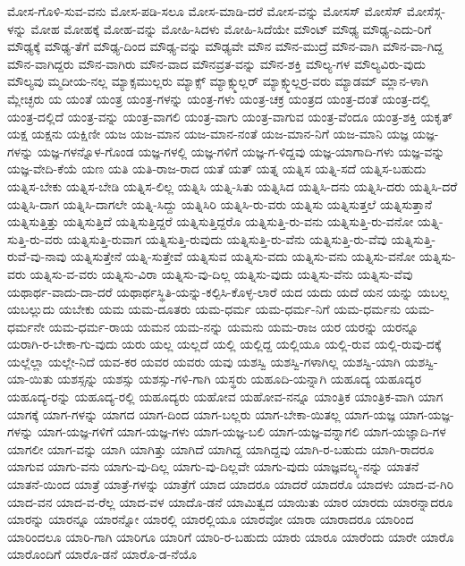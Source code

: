 {ಮೋಸ-ಗೊಳಿ-ಸುವ-ವನು
ಮೋಸ-ಪಡಿ-ಸಲೂ
ಮೋಸ-ಮಾಡಿ-ದರೆ
ಮೋಸ-ವನ್ನು
ಮೋಸಸ್
ಮೋಸೆಸ್
ಮೋಸೆಸ್ಗ-ಳನ್ನು
ಮೋಹ
ಮೋಹಕ್ಕೆ
ಮೋಹ-ವನ್ನು
ಮೋಹಿ-ಸಿದಳು
ಮೋಹಿ-ಸಿದೆಯೇ
ಮೌಂಟ್
ಮೌಢ್ಯ
ಮೌಢ್ಯ-ಎದು-ರಿಗೆ
ಮೌಢ್ಯಕ್ಕೆ
ಮೌಢ್ಯ-ತೆಗೆ
ಮೌಢ್ಯ-ದಿಂದ
ಮೌಢ್ಯ-ವನ್ನು
ಮೌಢ್ಯವೇ
ಮೌನ
ಮೌನ-ಮುದ್ರೆ
ಮೌನ-ವಾಗಿ
ಮೌನ-ವಾ-ಗಿದ್ದ
ಮೌನ-ವಾಗಿದ್ದರು
ಮೌನ-ವಾಗಿರು
ಮೌನ-ವಾದ
ಮೌನವ್ರತ-ವನ್ನು
ಮೌನ-ಶಕ್ತಿ
ಮೌಲ್ಯ-ಗಳ
ಮೌಲ್ಯವಿರು-ವುದು
ಮೌಲ್ಯವು
ಮ್ಮದೀಯ-ನಲ್ಲ
ಮ್ಯಾಕ್ಸಮುಲ್ಲರು
ಮ್ಯಾಕ್ಸ್
ಮ್ಯಾಕ್ಸ್ಮುಲ್ಲರ್
ಮ್ಯಾಕ್ಸ್ಮುಲ್ಲರ್ರ-ವರು
ಮ್ಯಾಡಮ್
ಮ್ಲಾನ-ಳಾಗಿ
ಮ್ಲೇಚ್ಛರು
ಯ
ಯಂತೆ
ಯಂತ್ರ
ಯಂತ್ರ-ಗಳನ್ನು
ಯಂತ್ರ-ಗಳು
ಯಂತ್ರ-ಚಕ್ರ
ಯಂತ್ರದ
ಯಂತ್ರ-ದಂತೆ
ಯಂತ್ರ-ದಲ್ಲಿ
ಯಂತ್ರ-ದಲ್ಲಿದೆ
ಯಂತ್ರ-ವನ್ನು
ಯಂತ್ರ-ವಾಗಲಿ
ಯಂತ್ರ-ವಾಗು
ಯಂತ್ರ-ವಾಗುವ
ಯಂತ್ರ-ವೆಂದೂ
ಯಂತ್ರ-ಶಕ್ತಿ
ಯಕೃತ್
ಯಕ್ಷ
ಯಕ್ಷನು
ಯಕ್ಷಿಣೀ
ಯಜ
ಯಜ-ಮಾನ
ಯಜ-ಮಾನ-ನಂತೆ
ಯಜ-ಮಾನ-ನಿಗೆ
ಯಜ-ಮಾನಿ
ಯಜ್ಞ
ಯಜ್ಞ-ಗಳನ್ನು
ಯಜ್ಞ-ಗಳನ್ನೊಳ-ಗೊಂಡ
ಯಜ್ಞ-ಗಳಲ್ಲಿ
ಯಜ್ಞ-ಗಳಿಗೆ
ಯಜ್ಞ-ಗ-ಳಿದ್ದವು
ಯಜ್ಞ-ಯಾಗಾದಿ-ಗಳು
ಯಜ್ಞ-ವನ್ನು
ಯಜ್ಞ-ವೇದಿ-ಕೆಯೆ
ಯಣ
ಯತಿ
ಯತಿ-ರಾಜ-ರಾದ
ಯತೆ
ಯತ್
ಯತ್ನ
ಯತ್ನಿಸ
ಯತ್ನಿ-ಸದೆ
ಯತ್ನಿಸ-ಬಹುದು
ಯತ್ನಿಸ-ಬೇಕು
ಯತ್ನಿಸ-ಬೇಡಿ
ಯತ್ನಿಸ-ಲಿಲ್ಲ
ಯತ್ನಿಸಿ
ಯತ್ನಿ-ಸಿತು
ಯತ್ನಿಸಿದ
ಯತ್ನಿಸಿ-ದನು
ಯತ್ನಿಸಿ-ದರು
ಯತ್ನಿಸಿ-ದರೆ
ಯತ್ನಿಸಿ-ದಾಗ
ಯತ್ನಿಸಿ-ದಾಗಲೇ
ಯತ್ನಿ-ಸಿದ್ದು
ಯತ್ನಿಸಿರಿ
ಯತ್ನಿಸಿ-ರು-ವರು
ಯತ್ನಿಸು
ಯತ್ನಿಸುತ್ತಲೆ
ಯತ್ನಿಸುತ್ತಾನೆ
ಯತ್ನಿಸುತ್ತಿತ್ತು
ಯತ್ನಿಸುತ್ತಿದೆ
ಯತ್ನಿಸುತ್ತಿದ್ದರೆ
ಯತ್ನಿಸುತ್ತಿದ್ದರೊ
ಯತ್ನಿಸುತ್ತಿ-ರು-ವನು
ಯತ್ನಿಸುತ್ತಿ-ರು-ವನೋ
ಯತ್ನಿ-ಸುತ್ತಿ-ರು-ವರು
ಯತ್ನಿಸುತ್ತಿ-ರುವಾಗ
ಯತ್ನಿಸುತ್ತಿ-ರುವುದು
ಯತ್ನಿಸುತ್ತಿ-ರು-ವೆನು
ಯತ್ನಿಸುತ್ತಿ-ರು-ವೆವು
ಯತ್ನಿಸುತ್ತಿ-ರುವೆ-ವು-ನಾವು
ಯತ್ನಿಸುತ್ತೇನೆ
ಯತ್ನಿ-ಸುತ್ತೇವೆ
ಯತ್ನಿಸುವ
ಯತ್ನಿಸು-ವದು
ಯತ್ನಿಸು-ವನು
ಯತ್ನಿಸು-ವನೋ
ಯತ್ನಿಸು-ವರು
ಯತ್ನಿಸು-ವ-ವರು
ಯತ್ನಿಸು-ವಿರಾ
ಯತ್ನಿಸು-ವು-ದಿಲ್ಲ
ಯತ್ನಿಸು-ವುದು
ಯತ್ನಿಸು-ವೆನು
ಯತ್ನಿಸು-ವೆವು
ಯಥಾರ್ಥ-ವಾದು-ದಾ-ದರೆ
ಯಥಾರ್ಥಸ್ಥಿತಿ-ಯನ್ನು-ಕಲ್ಪಿಸಿ-ಕೊಳ್ಳ-ಲಾರೆ
ಯದ
ಯದು
ಯದೆ
ಯನ
ಯನ್ನು
ಯಬಲ್ಲ
ಯಬಲ್ಲುದು
ಯಬೇಕು
ಯಮ
ಯಮ-ದೂತರು
ಯಮ-ಧರ್ಮ
ಯಮ-ಧರ್ಮ-ನಿಗೆ
ಯಮ-ಧರ್ಮನು
ಯಮ-ಧರ್ಮನೇ
ಯಮ-ಧರ್ಮ-ರಾಯ
ಯಮನ
ಯಮ-ನನ್ನು
ಯಮನು
ಯಮ-ರಾಜ
ಯರ
ಯರನ್ನು
ಯರನ್ನೂ
ಯರಾಗಿ-ರ-ಬೇಕಾ-ಗು-ವುದು
ಯರು
ಯಲ್ಲ
ಯಲ್ಲದೆ
ಯಲ್ಲಿ
ಯಲ್ಲಿದ್ದ
ಯಲ್ಲಿಯೂ
ಯಲ್ಲಿ-ರುವ
ಯಲ್ಲಿ-ರುವು-ದಕ್ಕೆ
ಯಲ್ಲೆಲ್ಲಾ
ಯಲ್ಲೇ-ನಿದೆ
ಯವ-ಕರ
ಯವರ
ಯವರು
ಯವು
ಯಶಸ್ವಿ
ಯಶಸ್ವಿ-ಗಳಾಗಿಲ್ಲ
ಯಶಸ್ವಿ-ಯಾಗಿ
ಯಶಸ್ವಿ-ಯಾ-ಯಿತು
ಯಶಸ್ಸನ್ನು
ಯಶಸ್ಸು
ಯಶಸ್ಸು-ಗಳಿ-ಗಾಗಿ
ಯಸ್ಥರು
ಯಹೂದಿ-ಯನ್ನಾಗಿ
ಯಹೂದ್ಯ
ಯಹೂದ್ಯರ
ಯಹೂದ್ಯ-ರನ್ನು
ಯಹೂದ್ಯ-ರಲ್ಲಿ
ಯಹೂದ್ಯರು
ಯಹೋವ
ಯಹೋವ-ನನ್ನೂ
ಯಾಂತ್ರಿಕ
ಯಾಂತ್ರಿಕ-ವಾಗಿ
ಯಾಗ
ಯಾಗಕ್ಕೆ
ಯಾಗ-ಗಳನ್ನು
ಯಾಗದ
ಯಾಗ-ದಿಂದ
ಯಾಗ-ಬಲ್ಲರು
ಯಾಗ-ಬೇಕಾ-ಯಿತಲ್ಲ
ಯಾಗ-ಯಜ್ಞ
ಯಾಗ-ಯಜ್ಞ-ಗಳನ್ನು
ಯಾಗ-ಯಜ್ಞ-ಗಳಿಗೆ
ಯಾಗ-ಯಜ್ಞ-ಗಳು
ಯಾಗ-ಯಜ್ಞ-ಬಲಿ
ಯಾಗ-ಯಜ್ಞ-ವನ್ನಾಗಲಿ
ಯಾಗ-ಯಜ್ಞಾದಿ-ಗಳ
ಯಾಗಲೀ
ಯಾಗ-ವನ್ನು
ಯಾಗಿ
ಯಾಗಿತ್ತು
ಯಾಗಿದೆ
ಯಾಗಿದ್ದ
ಯಾಗಿದ್ದವು
ಯಾಗಿ-ರ-ಬಹುದು
ಯಾಗಿ-ರಾದರೂ
ಯಾಗುವ
ಯಾಗು-ವನು
ಯಾಗು-ವು-ದಿಲ್ಲ
ಯಾಗು-ವು-ದಿಲ್ಲವೇ
ಯಾಗು-ವುದು
ಯಾಜ್ಞವಲ್ಕ್ಯ-ನನ್ನು
ಯಾತನೆ
ಯಾತನೆ-ಯಿಂದ
ಯಾತ್ರೆ
ಯಾತ್ರೆ-ಗಳನ್ನು
ಯಾತ್ರೆಗೆ
ಯಾದ
ಯಾದರೂ
ಯಾದರೆ
ಯಾದರೊ
ಯಾದಳು
ಯಾದ-ವ-ಗಿರಿ
ಯಾದ-ವನ
ಯಾದ-ವ-ರೆಲ್ಲ
ಯಾದ-ವಳ
ಯಾದೊ-ಡನೆ
ಯಾಮಿತ್ವದ
ಯಾಯಿತು
ಯಾರ
ಯಾರದು
ಯಾರನ್ನಾದರೂ
ಯಾರನ್ನು
ಯಾರನ್ನೂ
ಯಾರನ್ನೋ
ಯಾರಲ್ಲಿ
ಯಾರಲ್ಲಿಯೂ
ಯಾರವೋ
ಯಾರಾ
ಯಾರಾದರೂ
ಯಾರಿಂದ
ಯಾರಿಂದಲೂ
ಯಾರಿ-ಗಾಗಿ
ಯಾರಿಗೂ
ಯಾರಿಗೆ
ಯಾರಿ-ರ-ಬಹುದು
ಯಾರು
ಯಾರೂ
ಯಾರೆಂದು
ಯಾರೇ
ಯಾರೊ
ಯಾರೊಂದಿಗೆ
ಯಾರೊ-ಡನೆ
ಯಾರೊ-ಡ-ನೆಯೊ
}
